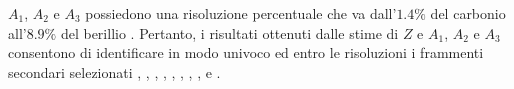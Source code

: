 \documentclass[12pt,a4paper,twoside]{report}
\newcommand{\matr}[1]{\boldsymbol{#1}}
\newcommand{\transp}[1]{{#1}^{\mathsf{T}}}
\newcommand{\vect}[1]{\boldsymbol{#1}}
\begin{document}
$A_1$, $A_2$ e $A_3$ possiedono una risoluzione percentuale che va dall'$1.4\%$ del carbonio  all'$8.9\%$ del berillio . Pertanto, i risultati ottenuti dalle stime di $Z$ e $A_1$, $A_2$ e $A_3$ consentono di identificare in modo univoco ed entro le risoluzioni i frammenti secondari selezionati , , , , , , , ,  e .
%		
\end{document}
